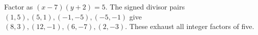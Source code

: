 Factor as $(x-7)(y+2)=5$. The signed divisor pairs $(1,5),(5,1),(-1,-5),(-5,-1)$ give $\boxed{(8,3),(12,-1),(6,-7),(2,-3)}$. These exhaust all integer factors of five.
